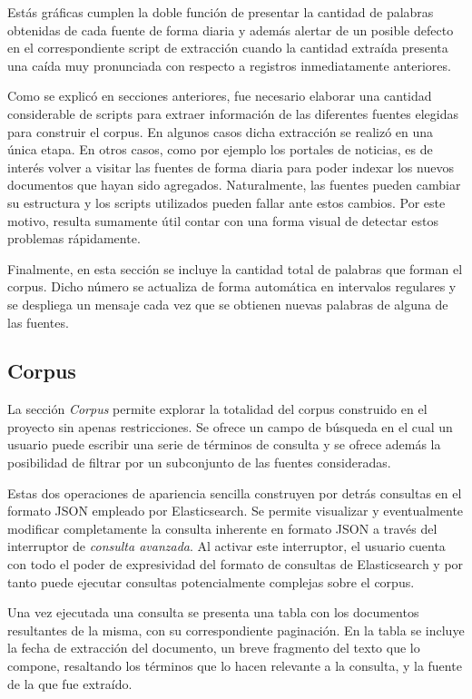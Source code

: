 Estás gráficas cumplen la doble función de presentar la cantidad de palabras obtenidas de cada fuente de
forma diaria y además alertar de un posible defecto en el correspondiente script de extracción cuando la
cantidad extraída presenta una caída muy pronunciada con respecto a registros inmediatamente anteriores.

Como se explicó en secciones anteriores, fue necesario elaborar una cantidad considerable de scripts para
extraer información de las diferentes fuentes elegidas para construir el corpus. En algunos casos dicha
extracción se realizó en una única etapa. En otros casos, como por ejemplo los portales de noticias, es de
interés volver a visitar las fuentes de forma diaria para poder indexar los nuevos documentos que hayan
sido agregados. Naturalmente, las fuentes pueden cambiar su estructura y los scripts utilizados pueden
fallar ante estos cambios. Por este motivo, resulta sumamente útil contar con una forma visual de detectar
estos problemas rápidamente.

Finalmente, en esta sección se incluye la cantidad total de palabras que forman el corpus. Dicho número se
actualiza de forma automática en intervalos regulares y se despliega un mensaje cada vez que se obtienen
nuevas palabras de alguna de las fuentes.

\subsection{Corpus}

La sección \textit{Corpus} permite explorar la totalidad del corpus construido en el proyecto sin apenas
restricciones. Se ofrece un campo de búsqueda en el cual un usuario puede escribir una serie de términos
de consulta y se ofrece además la posibilidad de filtrar por un subconjunto de las fuentes consideradas.

Estas dos operaciones de apariencia sencilla construyen por detrás consultas en el formato JSON empleado
por Elasticsearch. Se permite visualizar y eventualmente modificar completamente la consulta inherente en
formato JSON a través del interruptor de \textit{consulta avanzada}. Al activar este interruptor, el
usuario cuenta con todo el poder de expresividad del formato de consultas de Elasticsearch y por tanto
puede ejecutar consultas potencialmente complejas sobre el corpus.

Una vez ejecutada una consulta se presenta una tabla con los documentos resultantes de la misma, con su
correspondiente paginación. En la tabla se incluye la fecha de extracción del documento, un breve fragmento
del texto que lo compone, resaltando los términos que lo hacen relevante a la consulta, y la fuente de la
que fue extraído.

